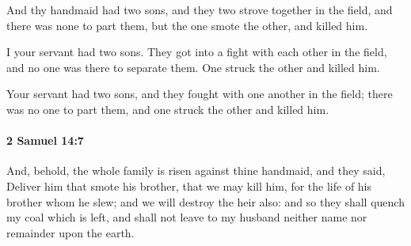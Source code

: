 			\begin{versebox}
					\item[BHS] 
					\item[ASV] And thy handmaid had two sons, and they two strove together in the field, and there was none to part them, but the one smote the other, and killed him.
					\item[NIV] I your servant had two sons. They got into a fight with each other in the field, and no one was there to separate them. One struck the other and killed him.
					\item[NRSV] Your servant had two sons, and they fought with one another in the field; there was no one to part them, and one struck the other and killed him.
			\end{versebox}

		\paragraph{2 Samuel 14:7} %
			\label{2SAMUEL-14-7}

			And, behold, the whole family is risen against thine handmaid, and they said, Deliver him that smote his brother, that we may kill him, for the life of his brother whom he slew; and we will destroy the heir also: and so they shall quench my coal which is left, and shall not leave to my husband neither name nor remainder upon the earth.

